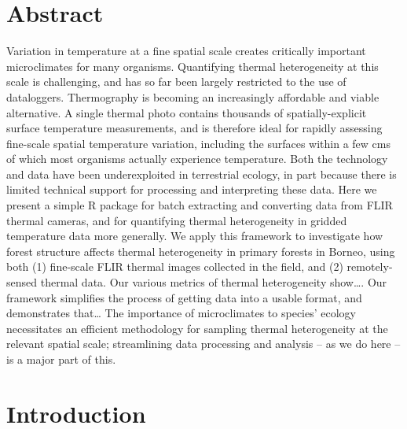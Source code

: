 \documentclass[12pt,a4paper,]{report}
\theoremstyle{definition}
\theoremstyle{definition}
\theoremstyle{definition}
\theoremstyle{remark}
\begin{document}
\pagebreak

\section{Abstract}\label{abstract-2}

Variation in temperature at a fine spatial scale creates critically
important microclimates for many organisms. Quantifying thermal
heterogeneity at this scale is challenging, and has so far been largely
restricted to the use of dataloggers. Thermography is becoming an
increasingly affordable and viable alternative. A single thermal photo
contains thousands of spatially-explicit surface temperature
measurements, and is therefore ideal for rapidly assessing fine-scale
spatial temperature variation, including the surfaces within a few cms
of which most organisms actually experience temperature. Both the
technology and data have been underexploited in terrestrial ecology, in
part because there is limited technical support for processing and
interpreting these data. Here we present a simple R package for batch
extracting and converting data from FLIR thermal cameras, and for
quantifying thermal heterogeneity in gridded temperature data more
generally. We apply this framework to investigate how forest structure
affects thermal heterogeneity in primary forests in Borneo, using both
(1) fine-scale FLIR thermal images collected in the field, and (2)
remotely-sensed thermal data. Our various metrics of thermal
heterogeneity show\ldots{}. Our framework simplifies the process of
getting data into a usable format, and demonstrates that\ldots{} The
importance of microclimates to species' ecology necessitates an
efficient methodology for sampling thermal heterogeneity at the relevant
spatial scale; streamlining data processing and analysis -- as we do
here -- is a major part of this.

\section{Introduction}\label{introduction-1}
\end{document}
